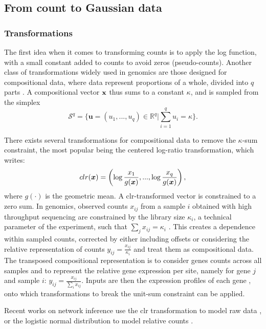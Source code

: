 \subsection{From count to Gaussian data} 
\subsubsection{Transformations}
The first idea when it comes to transforming counts is to apply the log function, with a  small constant added to counts to avoid zeros (pseudo-counts). Another class of transformations widely used in genomics are those designed for compositional data, where  data represent proportions of a whole, divided into $q$ parts \citep{A82}. A compositional vector $\bf{x}$ thus sums to a constant $\kappa$, and is sampled from the simplex
$$\mathcal{S}^q = \bigg\{ \boldsymbol{u}=(u_1,...,u_q)\in \mathds{R}^q\bigg\rvert\sum_{i=1}^q u_i = \kappa\bigg\}.$$

There exists several transformations for compositional data to remove the $\kappa$-sum constraint, the most popular being the centered log-ratio transformation, which writes:
$$clr({\boldsymbol{x}})=\left(\log \frac{x_1}{g(\boldsymbol{x})}, ..., \log \frac{x_q}{g(\boldsymbol{x})}\right), $$
where $g(\cdot)$ is the geometric mean. A clr-transformed vector is constrained to a zero sum. In genomics, observed counts $x_{ij}$ from a sample $i$ obtained with high throughput sequencing are constrained by the library size $\kappa_i$, a technical parameter of the experiment, such that $\sum_j x_{ij}=\kappa_i$ \citep{GMP17}. This creates a dependence within sampled counts, corrected  by either including offsets or  considering the relative representation of counts $y_{ij}=\frac{x_{ij}}{\kappa_i}$ and treat them as compositional data. The transposed compositional representation is to consider  genes counts across all samples and to represent the relative gene expression per site, namely for gene $j$ and sample $i$: $y_{ij}=\frac{x_{ij}}{\sum_i x_{ij}}$. Inputs are then the expression profiles of each gene \citep{RMR18}, onto which transformations to break the unit-sum constraint can be applied. 

Recent works on network inference use the clr transformation to model raw data \citep{kurtz}, or the logistic normal distribution \citep{AS80} to model relative counts \citep{gcoda}.
